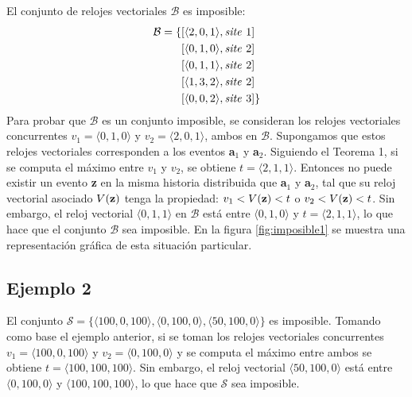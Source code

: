 \documentclass[12pt, times]{simauth}
\begin{document}
El conjunto de relojes vectoriales $\mathcal{B}$ es imposible:
\begin{align*}
\mathcal{B} = \{ & [\langle 2,0,1 \rangle, \text{\emph{site }} 1] \\
                  & [\langle 0,1,0 \rangle, \text{\emph{site }} 2] \\  
                  & [\langle 0,1,1 \rangle, \text{\emph{site }} 2] \\
                  & [\langle 1,3,2 \rangle, \text{\emph{site }} 2] \\
                  & [\langle 0,0,2 \rangle, \text{\emph{site }} 3] \} 
\end{align*}
Para probar que $\mathcal{B}$ es un conjunto imposible, se consideran los relojes vectoriales concurrentes $v_1 = \langle 0,1,0 \rangle$ y $v_2 = \langle 2,0,1 \rangle$, ambos en $\mathcal{B}$. Supongamos que estos relojes vectoriales corresponden a los eventos \textbf{a}$_1$ y \textbf{a}$_2$. Siguiendo el Teorema 1, si se computa el máximo entre $v_1$ y $v_2$, se obtiene $t = \langle 2,1,1 \rangle$. Entonces no puede existir un evento \textbf{z} en la misma historia distribuida que \textbf{a}$_1$ y \textbf{a}$_2$, tal que su reloj vectorial asociado $V(\text{\textbf{z}})$ tenga la propiedad: $v_1 < V(\text{\textbf{z}}) < t$ o $v_2 < V(\text{\textbf{z}}) < t$. Sin embargo, el reloj vectorial $\langle 0,1,1 \rangle$ en $\mathcal{B}$ está entre $\langle 0,1,0 \rangle$ y $t = \langle 2,1,1 \rangle$, lo que hace que el conjunto $\mathcal{B}$ sea imposible. En la figura \ref{fig:imposible1} se muestra una representación gráfica de esta situación particular.

\subsection{Ejemplo 2}
El conjunto $\mathcal{S} = \{\langle 100,0,100 \rangle, \langle 0, 100, 0\rangle, \langle 50,100,0 \rangle\}$ es imposible. Tomando como base el ejemplo anterior, si se toman los relojes vectoriales concurrentes $v_1 = \langle 100,0,100 \rangle$ y $v_2 = \langle 0,100,0 \rangle$ y se computa el máximo entre ambos se obtiene $t = \langle 100,100,100 \rangle$. Sin embargo, el reloj vectorial $\langle 50,100,0 \rangle$ está entre $\langle 0,100,0 \rangle$ y $\langle 100,100,100 \rangle$, lo que hace que $\mathcal{S}$ sea imposible.


\end{document}

